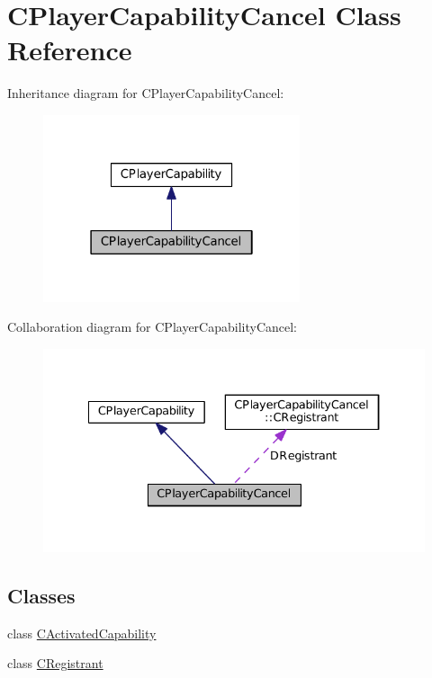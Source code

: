 \hypertarget{classCPlayerCapabilityCancel}{}\section{C\+Player\+Capability\+Cancel Class Reference}
\label{classCPlayerCapabilityCancel}


Inheritance diagram for C\+Player\+Capability\+Cancel\+:\nopagebreak
\begin{figure}[H]
\begin{center}
\leavevmode
\includegraphics[width=214pt]{classCPlayerCapabilityCancel__inherit__graph}
\end{center}
\end{figure}


Collaboration diagram for C\+Player\+Capability\+Cancel\+:\nopagebreak
\begin{figure}[H]
\begin{center}
\leavevmode
\includegraphics[width=334pt]{classCPlayerCapabilityCancel__coll__graph}
\end{center}
\end{figure}
\subsection*{Classes}
\begin{DoxyCompactItemize}
\item 
class \hyperlink{classCPlayerCapabilityCancel_1_1CActivatedCapability}{C\+Activated\+Capability}
\item 
class \hyperlink{classCPlayerCapabilityCancel_1_1CRegistrant}{C\+Registrant}
\end{DoxyCompactItemize}
